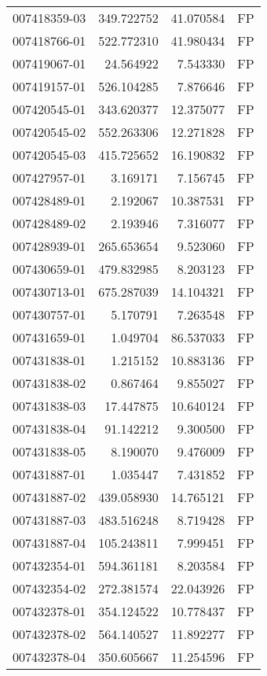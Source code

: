 \begin{tabular}{lrrl}
007418359-03 &  349.722752 &    41.070584 &   FP \\
007418766-01 &  522.772310 &    41.980434 &   FP \\
007419067-01 &   24.564922 &     7.543330 &   FP \\
007419157-01 &  526.104285 &     7.876646 &   FP \\
007420545-01 &  343.620377 &    12.375077 &   FP \\
007420545-02 &  552.263306 &    12.271828 &   FP \\
007420545-03 &  415.725652 &    16.190832 &   FP \\
007427957-01 &    3.169171 &     7.156745 &   FP \\
007428489-01 &    2.192067 &    10.387531 &   FP \\
007428489-02 &    2.193946 &     7.316077 &   FP \\
007428939-01 &  265.653654 &     9.523060 &   FP \\
007430659-01 &  479.832985 &     8.203123 &   FP \\
007430713-01 &  675.287039 &    14.104321 &   FP \\
007430757-01 &    5.170791 &     7.263548 &   FP \\
007431659-01 &    1.049704 &    86.537033 &   FP \\
007431838-01 &    1.215152 &    10.883136 &   FP \\
007431838-02 &    0.867464 &     9.855027 &   FP \\
007431838-03 &   17.447875 &    10.640124 &   FP \\
007431838-04 &   91.142212 &     9.300500 &   FP \\
007431838-05 &    8.190070 &     9.476009 &   FP \\
007431887-01 &    1.035447 &     7.431852 &   FP \\
007431887-02 &  439.058930 &    14.765121 &   FP \\
007431887-03 &  483.516248 &     8.719428 &   FP \\
007431887-04 &  105.243811 &     7.999451 &   FP \\
007432354-01 &  594.361181 &     8.203584 &   FP \\
007432354-02 &  272.381574 &    22.043926 &   FP \\
007432378-01 &  354.124522 &    10.778437 &   FP \\
007432378-02 &  564.140527 &    11.892277 &   FP \\
007432378-04 &  350.605667 &    11.254596 &   FP \\

\end{tabular}
